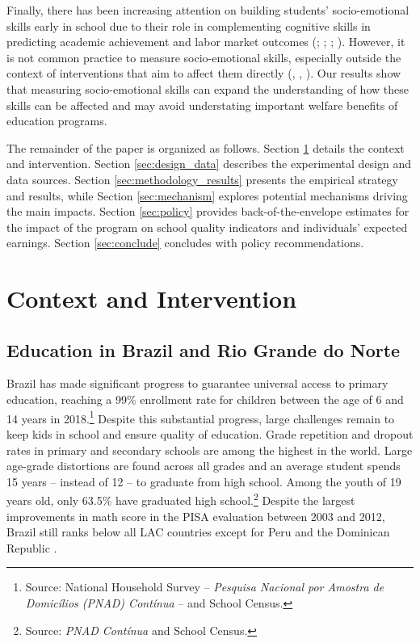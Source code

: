 \documentclass[11pt,a4paper]{article}
\begin{document}
Finally, there has been increasing attention on building students' socio-emotional skills early in school due to their role in complementing cognitive skills in predicting academic achievement and labor market outcomes (\citealp{heckman2001importance}; \citealp{heckman2006effects}; \citealp{almlund2011personality}; \citealp{lindqvist2011labor}). However, it is not common practice to measure socio-emotional skills, especially outside the context of interventions that aim to affect them directly (\citealp{heckman2000policies}, \citealp{heckman2012hard}, \citealp{sanchez2016taking}). Our results show that measuring socio-emotional skills can expand the understanding of how these skills can be affected and may avoid understating important welfare benefits of education programs.  


The remainder of the paper is organized as follows. Section \ref{sec:context} details the context and intervention. Section \ref{sec:design_data} describes the experimental design and data sources. Section \ref{sec:methodology_results} presents the empirical strategy and results, while Section \ref{sec:mechanism} explores potential mechanisms driving the main impacts. Section \ref{sec:policy} provides back-of-the-envelope estimates for the impact of the program on school quality indicators and individuals' expected earnings. Section \ref{sec:conclude} concludes with policy recommendations.



\section{Context and Intervention} \label{sec:context}

\subsection{Education in Brazil and Rio Grande do Norte} \label{sec:brazil}

Brazil has made significant progress to guarantee universal access to primary education, reaching a 99\% enrollment rate for children between the age of 6 and 14 years in 2018.\footnote{Source: National Household Survey -- \textit{Pesquisa Nacional por Amostra de Domicílios (PNAD) Contínua} -- and School Census.} Despite this substantial progress, large challenges remain to keep kids in school and ensure quality of education. Grade repetition and dropout rates in primary and secondary schools are among the highest in the world. Large age-grade distortions are found across all grades and an average student spends 15 years -- instead of 12 -- to graduate from high school. Among the youth of 19 years old, only 63.5\% have graduated high school.\footnote{Source: \textit{PNAD Contínua} and School Census.} Despite the largest improvements in math score in the PISA evaluation between 2003 and 2012, Brazil still ranks below all LAC countries except for Peru and the Dominican Republic \citep{data-00365}.
\end{document}
